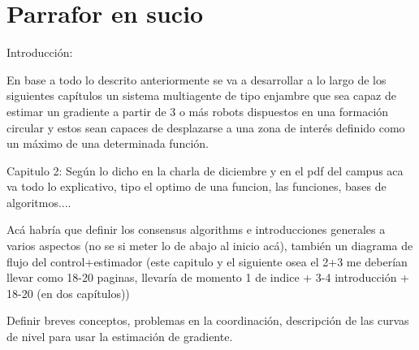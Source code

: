 \newpage
\thispagestyle{empty}
\mbox{}

\chapter{Parrafor en sucio}
\label{ch:chapter6}

Introducción:

En base a todo lo descrito anteriormente se va a desarrollar a lo largo de los siguientes capítulos un  sistema multiagente de tipo enjambre que sea capaz de estimar un gradiente a partir de 3 o más robots dispuestos en una formación circular y estos sean capaces de desplazarse a una zona de interés definido como un máximo de una determinada función.


Capitulo 2: Según lo dicho en la charla de diciembre y en el pdf del campus aca va todo lo explicativo, tipo el optimo de una funcion, las funciones, bases de algoritmos....

Acá habría que definir los consensus algorithms e introducciones generales a varios aspectos (no se si meter lo de abajo al inicio acá), también un diagrama de flujo del control+estimador (este capitulo y el siguiente osea el 2+3 me deberían llevar como 18-20 paginas, llevaría de momento 1 de indice + 3-4 introducción + 18-20 (en dos capítulos))


Definir breves conceptos, problemas en la coordinación, descripción de las curvas de nivel para usar la estimación de gradiente.

